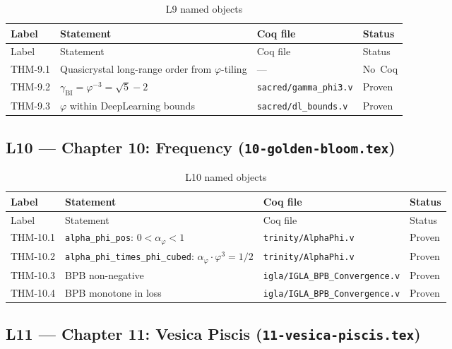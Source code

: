 \begin{longtable}{lp{6cm}ll}
\toprule
Label & Statement & Coq file & Status \\
\midrule
\endfirsthead
\toprule
Label & Statement & Coq file & Status \\
\midrule
\endhead
\bottomrule
\endfoot
\bottomrule
\caption{L9 named objects}
\endlastfoot
THM-9.1 & Quasicrystal long-range order from $\varphi$-tiling & --- & No~Coq \\
THM-9.2 & $\gamma_{\text{BI}} = \varphi^{-3} = \sqrt{5}-2$ &
  \texttt{sacred/gamma\_phi3.v} & Proven \\
THM-9.3 & $\varphi$ within DeepLearning bounds &
  \texttt{sacred/dl\_bounds.v} & Proven \\
\end{longtable}

\subsection{L10 — Chapter 10: Frequency (\texttt{10-golden-bloom.tex})}
\label{sec:A-L10}

\begin{longtable}{lp{6cm}ll}
\toprule
Label & Statement & Coq file & Status \\
\midrule
\endfirsthead
\toprule
Label & Statement & Coq file & Status \\
\midrule
\endhead
\bottomrule
\endfoot
\bottomrule
\caption{L10 named objects}
\endlastfoot
THM-10.1 & \texttt{alpha\_phi\_pos}: $0 < \alpha_{\varphi} < 1$ &
  \texttt{trinity/AlphaPhi.v} & Proven \\
THM-10.2 & \texttt{alpha\_phi\_times\_phi\_cubed}:
  $\alpha_{\varphi}\cdot\varphi^{3}=1/2$ &
  \texttt{trinity/AlphaPhi.v} & Proven \\
THM-10.3 & BPB non-negative &
  \texttt{igla/IGLA\_BPB\_Convergence.v} & Proven \\
THM-10.4 & BPB monotone in loss &
  \texttt{igla/IGLA\_BPB\_Convergence.v} & Proven \\
\end{longtable}

\subsection{L11 — Chapter 11: Vesica Piscis (\texttt{11-vesica-piscis.tex})}
\label{sec:A-L11}

